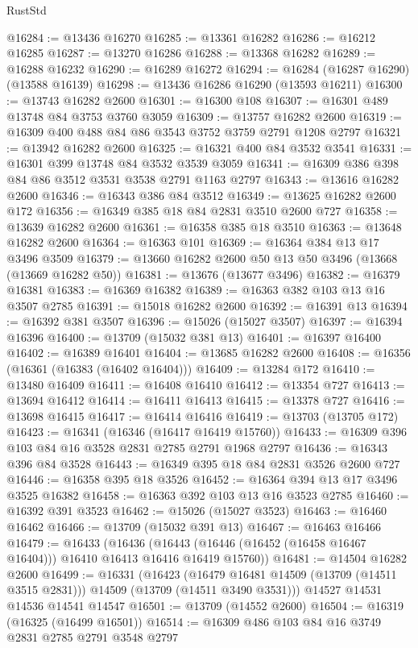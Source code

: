 \begin{lexlean}{RustStd}
\begin{coremodule}
@16284 := @13436 @16270
@16285 := @13361 @16282
@16286 := @16212 @16285
@16287 := @13270 @16286
@16288 := @13368 @16282
@16289 := @16288 @16232
@16290 := @16289 @16272
@16294 := @16284 (@16287 @16290) (@13588 @16139)
@16298 := @13436 @16286 @16290 (@13593 @16211)
@16300 := @13743 @16282 @2600
@16301 := @16300 @108
@16307 := @16301 @489 @13748 @84 @3753 @3760 @3059
@16309 := @13757 @16282 @2600
@16319 := @16309 @400 @488 @84 @86 @3543 @3752 @3759 @2791 @1208 @2797
@16321 := @13942 @16282 @2600
@16325 := @16321 @400 @84 @3532 @3541
@16331 := @16301 @399 @13748 @84 @3532 @3539 @3059
@16341 := @16309 @386 @398 @84 @86 @3512 @3531 @3538 @2791 @1163 @2797
@16343 := @13616 @16282 @2600
@16346 := @16343 @386 @84 @3512
@16349 := @13625 @16282 @2600 @172
@16356 := @16349 @385 @18 @84 @2831 @3510 @2600 @727
@16358 := @13639 @16282 @2600
@16361 := @16358 @385 @18 @3510
@16363 := @13648 @16282 @2600
@16364 := @16363 @101
@16369 := @16364 @384 @13 @17 @3496 @3509
@16379 := @13660 @16282 @2600 @50 @13 @50 @3496 (@13668 (@13669 @16282 @50))
@16381 := @13676 (@13677 @3496)
@16382 := @16379 @16381
@16383 := @16369 @16382
@16389 := @16363 @382 @103 @13 @16 @3507 @2785
@16391 := @15018 @16282 @2600
@16392 := @16391 @13
@16394 := @16392 @381 @3507
@16396 := @15026 (@15027 @3507)
@16397 := @16394 @16396
@16400 := @13709 (@15032 @381 @13)
@16401 := @16397 @16400
@16402 := @16389 @16401
@16404 := @13685 @16282 @2600
@16408 := @16356 (@16361 (@16383 (@16402 @16404)))
@16409 := @13284 @172
@16410 := @13480 @16409
@16411 := @16408 @16410
@16412 := @13354 @727
@16413 := @13694 @16412
@16414 := @16411 @16413
@16415 := @13378 @727
@16416 := @13698 @16415
@16417 := @16414 @16416
@16419 := @13703 (@13705 @172)
@16423 := @16341 (@16346 (@16417 @16419 @15760))
@16433 := @16309 @396 @103 @84 @16 @3528 @2831 @2785 @2791 @1968 @2797
@16436 := @16343 @396 @84 @3528
@16443 := @16349 @395 @18 @84 @2831 @3526 @2600 @727
@16446 := @16358 @395 @18 @3526
@16452 := @16364 @394 @13 @17 @3496 @3525 @16382
@16458 := @16363 @392 @103 @13 @16 @3523 @2785
@16460 := @16392 @391 @3523
@16462 := @15026 (@15027 @3523)
@16463 := @16460 @16462
@16466 := @13709 (@15032 @391 @13)
@16467 := @16463 @16466
@16479 := @16433
    (@16436 (@16443 (@16446 (@16452 (@16458 @16467 @16404))) @16410 @16413 @16416 @16419 @15760))
@16481 := @14504 @16282 @2600
@16499 := @16331
    (@16423
      (@16479 @16481 @14509 (@13709 (@14511 @3515 @2831)))
      @14509
      (@13709 (@14511 @3490 @3531)))
    @14527
    @14531
    @14536
    @14541
    @14547
@16501 := @13709 (@14552 @2600)
@16504 := @16319 (@16325 (@16499 @16501))
@16514 := @16309 @486 @103 @84 @16 @3749 @2831 @2785 @2791 @3548 @2797

\end{coremodule}
\end{lexlean}

